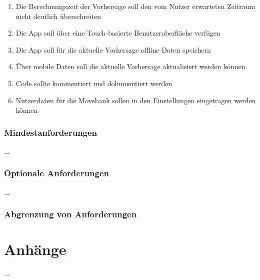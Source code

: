 \documentclass[12pt]{article} %
\begin{document}
\begin{enumerate}[(R1)]
		\item Die Berechnungszeit der Vorhersage soll den vom Nutzer erwarteten Zeitraum nicht deutlich überschreiten
		\item Die App soll über eine Touch-basierte Benutzeroberfläche verfügen
		\item Die App soll für die aktuelle Vorhersage offline-Daten speichern
		\item Über mobile Daten soll die aktuelle Vorhersage aktualisiert werden können
		\item Code sollte kommentiert und dokumentiert werden
		\item Nutzerdaten für die Movebank sollen in den Einstellungen eingetragen werden können	
 	\end{enumerate}

 \subsubsection{Mindestanforderungen}

 ...

 \subsubsection{Optionale Anforderungen}

 ...

 \subsubsection{Abgrenzung von Anforderungen}


\section{Anhänge}

...
\end{document}
